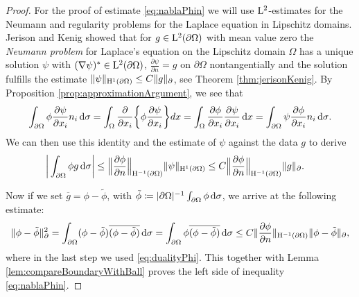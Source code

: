 \begin{proof}
  For the proof of estimate \eqref{eq:nablaPhin} we will use $\mathrm{L}^2$-estimates for the Neumann and regularity problems for the Laplace equation in Lipschitz domains.
  Jerison and Kenig showed that for $g \in \mathrm{L}^2(\partial\Omega)$ with mean value zero the \emph{Neumann problem} for Laplace's equation on the Lipschitz domain $\Omega$ has a unique solution $\psi$ with  $(\nabla \psi)^* \in \mathrm{L}^2(\partial\Omega)$, $\frac{\partial \psi}{\partial n} = g$ on $\partial \Omega$ nontangentially and the solution fulfills the estimate $\|\psi\|_{\mathrm{H}^1(\partial\Omega)} \leq C \|g\|_\partial$, see Theorem \ref{thm:jerisonKenig}.
  By Proposition \ref{prop:approximationArgument}, we see that
  \begin{align*}
    \int_{\partial\Omega} \phi \frac{\partial\psi}{\partial x_i} n_i \, {\operatorname{d}\!{\sigma}}  
    = \int_\Omega \frac{\partial}{\partial x_i} \bigg\{ \phi \frac{\partial\psi}{\partial x_i} \bigg\} d x 
    = \int_\Omega \frac{\partial \phi}{\partial x_i} \frac{\partial \psi}{\partial x_i} \, {\operatorname{d}\!{x}} 
    = \int_{\partial\Omega} \psi \frac{\partial \phi}{\partial x_i} n_i \, {\operatorname{d}\!{\sigma}}.
  \end{align*}
  We can then use this identity and the estimate of $\psi$ against the data $g$ to derive
  \begin{align}
    \label{eq:dualityPhi}
    \bigg| \int_{\partial\Omega} \phi g \, {\operatorname{d}\!{\sigma}} \bigg|
    &\leq \Big\| \frac{\partial \phi}{\partial n} \Big\|_{\mathrm{H}^{-1}(\partial\Omega)} \| \psi \|_{\mathrm{H}^1(\partial\Omega)} 
    \leq C \Big\| \frac{\partial \phi}{\partial n} \Big\|_{\mathrm{H}^{-1}(\partial\Omega)} \| g\|_\partial.
  \end{align}
  
  Now if we set $\overline g = \phi - \tilde \phi$, with $\tilde \phi \coloneqq |\partial \Omega|^{-1} \int_{\partial\Omega} \phi \, {\operatorname{d}\!{\sigma}}$, we arrive at the following estimate:
  \begin{align*}
    \| \phi - \tilde\phi \|_\partial^2
    = \int_{\partial\Omega} (\phi - \tilde \phi) \overline{(\phi - \tilde\phi)} \, {\operatorname{d}\!{\sigma}} 
    = \int_{\partial\Omega} \phi \overline{(\phi - \tilde\phi)} \, {\operatorname{d}\!{\sigma}} 
    \leq C \|\frac{\partial\phi}{\partial n} \|_{\mathrm{H}^{-1}(\partial\Omega)} \|\phi - \tilde \phi\|_\partial,
  \end{align*}
  where in the last step we used \eqref{eq:dualityPhi}.
  This together with Lemma \ref{lem:compareBoundaryWithBall} proves the left side of inequality \eqref{eq:nablaPhin}.


\end{proof}
